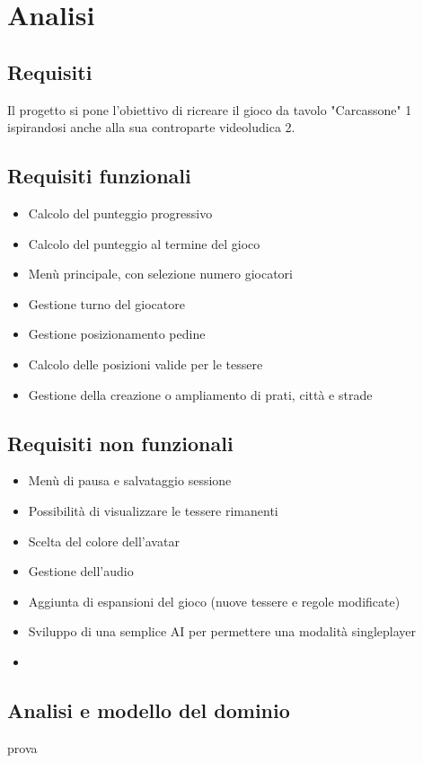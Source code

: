 \section{Analisi}
\subsection{Requisiti}
Il progetto si pone l'obiettivo di ricreare il gioco da tavolo "Carcassone" 1 ispirandosi anche alla sua controparte videoludica 2.

\subsection*{Requisiti funzionali}
\begin{itemize}
\item Calcolo del punteggio progressivo
\item Calcolo del punteggio al termine del gioco
\item Menù principale, con selezione numero giocatori
\item Gestione turno del giocatore
\item Gestione posizionamento pedine
\item Calcolo delle posizioni valide per le tessere
\item Gestione della creazione o ampliamento di prati, città e strade
\end{itemize}

\subsection*{Requisiti non funzionali}
\begin{itemize}
\item Menù di pausa e salvataggio sessione
\item Possibilità di visualizzare le tessere rimanenti
\item Scelta del colore dell’avatar
\item Gestione dell’audio
\item Aggiunta di espansioni del gioco (nuove tessere e regole modificate)
\item Sviluppo di una semplice AI per permettere una modalità singleplayer
\item \end{itemize}

\subsection{Analisi e modello del dominio}
prova